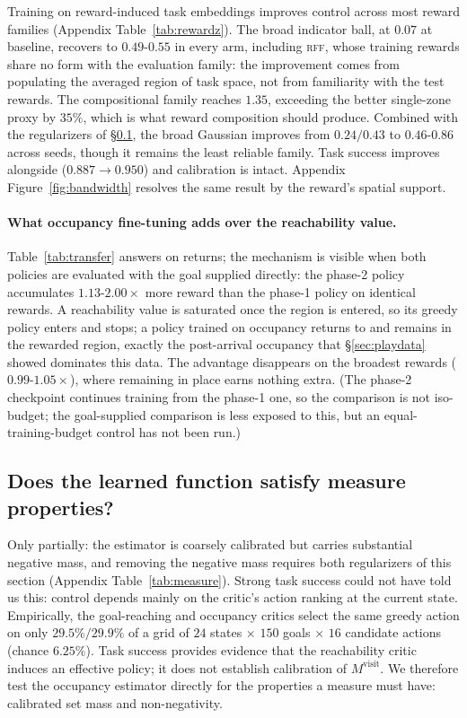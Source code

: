 \documentclass{article}
\newcommand{\Visit}{\mathrm{visit}}
\begin{document}
Training on reward-induced task embeddings improves control across most reward families (Appendix Table~\ref{tab:rewardz}).
The broad indicator ball, at $0.07$ at baseline, recovers to $0.49$-$0.55$ in every arm, including \textsc{rff}, whose training rewards share no form with the evaluation family: the improvement comes from populating the averaged region of task space, not from familiarity with the test rewards.
The compositional family reaches $1.35$, exceeding the better single-zone proxy by $35\%$, which is what reward composition should produce.
Combined with the regularizers of \S\ref{sec:rq3}, the broad Gaussian improves from $0.24/0.43$ to $0.46$-$0.86$ across seeds, though it remains the least reliable family.
Task success improves alongside ($0.887\to0.950$) and calibration is intact.
Appendix Figure~\ref{fig:bandwidth} resolves the same result by the reward's spatial support.

\paragraph{What occupancy fine-tuning adds over the reachability value.}
\label{sec:cross-method}

Table~\ref{tab:transfer} answers on returns; the mechanism is visible when both policies are evaluated with the goal supplied directly: the phase-2 policy accumulates $1.13$-$2.00\times$ more reward than the phase-1 policy on identical rewards.
A reachability value is saturated once the region is entered, so its greedy policy enters and stops; a policy trained on occupancy returns to and remains in the rewarded region, exactly the post-arrival occupancy that \S\ref{sec:playdata} showed dominates this data.
The advantage disappears on the broadest rewards ($0.99$-$1.05\times$), where remaining in place earns nothing extra.
(The phase-2 checkpoint continues training from the phase-1 one, so the comparison is not iso-budget; the goal-supplied comparison is less exposed to this, but an equal-training-budget control has not been run.)

\subsection{Does the learned function satisfy measure properties?}
\label{sec:rq3}\label{sec:measure-validity}

Only partially: the estimator is coarsely calibrated but carries substantial negative mass, and removing the negative mass requires both regularizers of this section (Appendix Table~\ref{tab:measure}).
Strong task success could not have told us this: control depends mainly on the critic's action ranking at the current state.
Empirically, the goal-reaching and occupancy critics select the same greedy action on only $29.5\%/29.9\%$ of a grid of $24$ states $\times$ $150$ goals $\times$ $16$ candidate actions (chance $6.25\%$).
Task success provides evidence that the reachability critic induces an effective policy; it does not establish calibration of $M^{\Visit}$.
We therefore test the occupancy estimator directly for the properties a measure must have: calibrated set mass and non-negativity.
\end{document}
